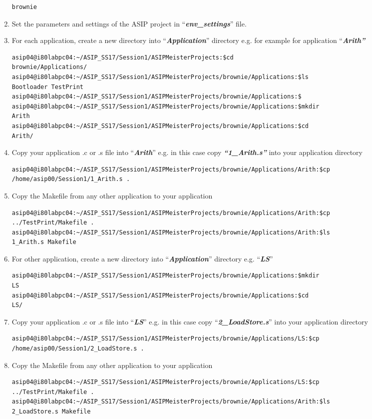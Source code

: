 \begin{enumerate}
\begin{lstlisting}
brownie
\end{lstlisting}
	\item Set the parameters and settings of the ASIP project in 
	``\emph{\textbf{env\_settings}}'' file.
	\item For each application, create a new directory into
	``\emph{\textbf{Application}}'' directory e.g. for example for application ``\emph{\textbf{Arith''}}
\begin{lstlisting}
asip04@i80labpc04:~/ASIP_SS17/Session1/ASIPMeisterProjects:$cd
brownie/Applications/
asip04@i80labpc04:~/ASIP_SS17/Session1/ASIPMeisterProjects/brownie/Applications:$ls
Bootloader TestPrint
asip04@i80labpc04:~/ASIP_SS17/Session1/ASIPMeisterProjects/brownie/Applications:$
asip04@i80labpc04:~/ASIP_SS17/Session1/ASIPMeisterProjects/brownie/Applications:$mkdir
Arith
asip04@i80labpc04:~/ASIP_SS17/Session1/ASIPMeisterProjects/brownie/Applications:$cd
Arith/
\end{lstlisting}
	\item Copy your application .c or .s file into ``\emph{\textbf{Arith}}''
	e.g. in this case copy \emph{\textbf{``1\_Arith.s''}} into your
	application directory
\begin{lstlisting}
asip04@i80labpc04:~/ASIP_SS17/Session1/ASIPMeisterProjects/brownie/Applications/Arith:$cp
/home/asip00/Session1/1_Arith.s .
\end{lstlisting}
	\item Copy the Makefile from any other application to your application
\begin{lstlisting}
asip04@i80labpc04:~/ASIP_SS17/Session1/ASIPMeisterProjects/brownie/Applications/Arith:$cp
../TestPrint/Makefile .
asip04@i80labpc04:~/ASIP_SS17/Session1/ASIPMeisterProjects/brownie/Applications/Arith:$ls
1_Arith.s Makefile
\end{lstlisting}
	\item For other application, create a new directory into
	``\emph{\textbf{Application}}'' directory e.g. ``\emph{\textbf{LS}}''
\begin{lstlisting}
asip04@i80labpc04:~/ASIP_SS17/Session1/ASIPMeisterProjects/brownie/Applications:$mkdir
LS
asip04@i80labpc04:~/ASIP_SS17/Session1/ASIPMeisterProjects/brownie/Applications:$cd
LS/
\end{lstlisting}
	\item Copy your application .c or .s file into ``\emph{\textbf{LS}}'' e.g.
	in this case copy ``\emph{\textbf{2\_LoadStore.s}}'' into your
	application directory
\begin{lstlisting}
asip04@i80labpc04:~/ASIP_SS17/Session1/ASIPMeisterProjects/brownie/Applications/LS:$cp
/home/asip00/Session1/2_LoadStore.s .
\end{lstlisting}
	\item Copy the Makefile from any other application to your application
\begin{lstlisting}
asip04@i80labpc04:~/ASIP_SS17/Session1/ASIPMeisterProjects/brownie/Applications/LS:$cp
../TestPrint/Makefile .
asip04@i80labpc04:~/ASIP_SS17/Session1/ASIPMeisterProjects/brownie/Applications/Arith:$ls
2_LoadStore.s Makefile
\end{lstlisting}
\end{enumerate}
